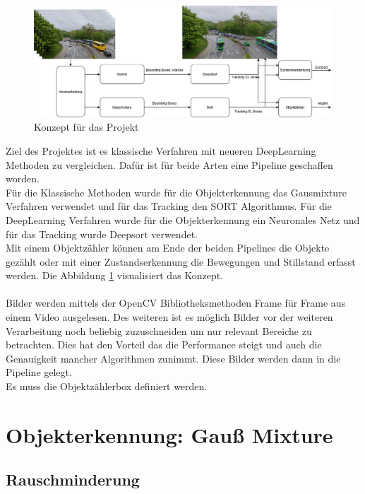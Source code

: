 \documentclass[conference]{IEEEtran}
\begin{document}
	\begin{figure}[!h]
		\begin{center}
			\includegraphics[width=16cm]{Media/KonzeptVAOT.png}
			\caption{Konzept für das Projekt}
			\label{Konzept}
		\end{center}
	\end{figure}
	Ziel des Projektes ist es klassische Verfahren mit neueren DeepLearning Methoden zu vergleichen.
	Dafür ist für beide Arten eine Pipeline geschaffen worden.\\
	Für die Klassische Methoden wurde für die Objekterkennung das Gausmixture Verfahren verwendet und für das Tracking den SORT Algorithmus. Für die DeepLearning Verfahren wurde für die Objekterkennung ein Neuronales Netz  und für das Tracking wurde Deepsort verwendet.\\
	Mit einem Objektzähler können am Ende der beiden Pipelines die Objekte gezählt oder mit einer Zustandserkennung die Bewegungen und Stillstand erfasst werden. Die Abbildung \ref{Konzept} visualisiert das Konzept.\\
	\\
	Bilder werden mittels der OpenCV Bibliotheksmethoden Frame für Frame aus einem Video ausgelesen. Des weiteren ist es möglich Bilder vor der weiteren Verarbeitung noch beliebig zuzuschneiden um nur relevant Bereiche zu betrachten. Dies hat den Vorteil das die Performance steigt und auch die Genauigkeit mancher Algorithmen zunimmt. Diese Bilder werden dann in die Pipeline gelegt.\\
	Es muss die Objektzählerbox definiert werden.
	
	\section{Objekterkennung: Gauß Mixture}
	
	\subsection{Rauschminderung}
	
\end{document}
